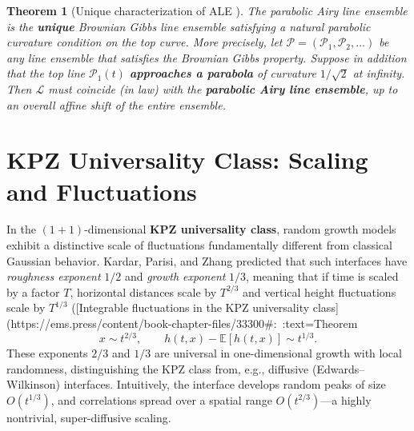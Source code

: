 \documentclass[letterpaper,11pt,oneside,reqno]{article}
\numberwithin{equation}{section}
\newtheorem{theorem}[proposition]{Theorem}
\theoremstyle{definition}
\begin{document}
\begin{theorem}[Unique characterization of ALE \cite{AggarwalHuang2023Characterization}]
	The parabolic Airy line ensemble is the \textbf{unique} Brownian Gibbs line ensemble satisfying a natural parabolic curvature condition on the top curve. More precisely, let $\boldsymbol{\mathcal{P}}=(\mathcal{P}_1,\mathcal{P}_2,\ldots)$ be any line ensemble that satisfies the Brownian Gibbs property. Suppose in addition that the top line $\mathcal{P}_1(t)$ \textbf{approaches a parabola} of curvature $1/\sqrt{2}$ at infinity. Then $\boldsymbol{\mathcal{L}}$ must coincide (in law) with the \textbf{parabolic Airy line ensemble}, up to an overall affine shift of the entire ensemble.
\end{theorem}





\section{KPZ Universality Class: Scaling and Fluctuations}

In the $(1+1)$-dimensional \textbf{KPZ universality class}, random growth models exhibit a distinctive scale of fluctuations fundamentally different from classical Gaussian behavior. Kardar, Parisi, and Zhang predicted that such interfaces have \emph{roughness exponent} $1/2$ and \emph{growth exponent} $1/3$, meaning that if time is scaled by a factor $T$, horizontal distances scale by $T^{2/3}$ and vertical height fluctuations scale by $T^{1/3}$ ([Integrable fluctuations in the KPZ universality class](https://ems.press/content/book-chapter-files/33300#:~:text=Theorem%
\[ x \sim t^{2/3}, \qquad h(t,x)-\mathbb{E}[h(t,x)] \sim t^{1/3}. \]
These exponents $2/3$ and $1/3$ are universal in one-dimensional growth with local randomness, distinguishing the KPZ class from, e.g., diffusive (Edwards–Wilkinson) interfaces. Intuitively, the interface develops random peaks of size $O(t^{1/3})$, and correlations spread over a spatial range $O(t^{2/3})$—a highly nontrivial, super-diffusive scaling.
\end{document}

